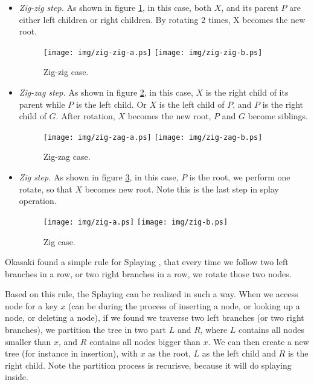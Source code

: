\documentclass{article}
\begin{document}
\begin{itemize}
\item {\em Zig-zig step.} As shown in figure \ref{fig:zig-zig}, in this case,
both $X$, and its parent $P$ are either left children or right children. By
rotating 2 times, X becomes the new root.
 
\begin{figure}[htbp]
   \begin{center}
   	  \texttt{[image: img/zig-zig-a.ps]} 
          \texttt{[image: img/zig-zig-b.ps]}
          \caption{Zig-zig case.} \label{fig:zig-zig}
   \end{center}
\end{figure}

\item {\em Zig-zag step.} As shown in figure \ref{fig:zig-zag}, in this
case, $X$ is the right child of its parent while $P$ is the left child.
Or $X$ is the left child of $P$, and $P$ is the right child of $G$.
After rotation, $X$ becomes the new root, $P$ and $G$ become siblings.

\begin{figure}[htbp]
   \begin{center}
   	  \texttt{[image: img/zig-zag-a.ps]}
          \texttt{[image: img/zig-zag-b.ps]}
          \caption{Zig-zag case.} \label{fig:zig-zag}
   \end{center}
\end{figure}

\item {\em Zig step.} As shown in figure \ref{fig:zig}, in this case,
$P$ is the root, we perform one rotate, so that $X$ becomes new root.
Note this is the last step in splay operation.

\begin{figure}[htbp]
   \begin{center}
   	  \texttt{[image: img/zig-a.ps]}
          \texttt{[image: img/zig-b.ps]}
          \caption{Zig case.} \label{fig:zig}
   \end{center}
\end{figure}

\end{itemize}

Okasaki found a simple rule for Splaying \cite{okasaki-book}, 
that every time we follow
two left branches in a row, or two right branches in a row, we rotate
those two nodes.

Based on this rule, the Splaying can be realized in such a way.
When we access node for a key $x$ (can be during the process of 
inserting a node, or looking up a node, or deleting a node), if
we found we traverse two left branches (or two right branches), we
partition the tree in two part $L$ and $R$, where $L$ contains all
nodes smaller than $x$, and $R$ contains all nodes bigger than $x$.
We can then create a new tree (for instance in insertion), 
with $x$ as the root, $L$ as the left child and $R$ is the right child.
Note the partition process is recurisve, because it will do splaying
inside.
\end{document}
